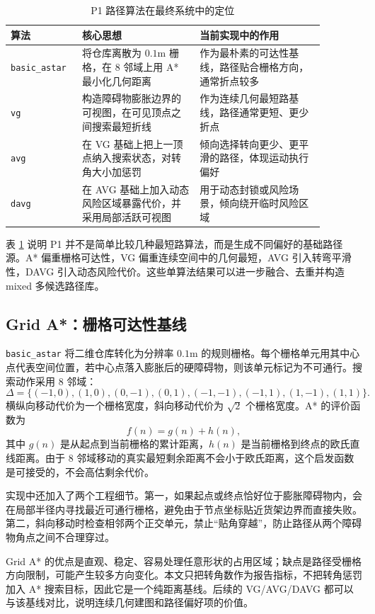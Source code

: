 \begin{table}[H]
\centering
\small
\begin{tabular}{p{0.18\linewidth}p{0.34\linewidth}p{0.36\linewidth}}
\toprule
算法 & 核心思想 & 当前实现中的作用 \\
\midrule
\verb|basic_astar| & 将仓库离散为 $0.1$m 栅格，在 8 邻域上用 A* 最小化几何距离 & 作为最朴素的可达性基线，路径贴合栅格方向，通常折点较多 \\
\verb|vg| & 构造障碍物膨胀边界的可视图，在可见顶点之间搜索最短折线 & 作为连续几何最短路基线，路径通常更短、更少折点 \\
\verb|avg| & 在 VG 基础上把上一顶点纳入搜索状态，对转角大小加惩罚 & 倾向选择转向更少、更平滑的路径，体现运动执行偏好 \\
\verb|davg| & 在 AVG 基础上加入动态风险区域暴露代价，并采用局部活跃可视图 & 用于动态封锁或风险场景，倾向绕开临时风险区域 \\

\bottomrule
\end{tabular}
\caption{P1 路径算法在最终系统中的定位}
\label{tab:p1-methods}
\end{table}

表 \ref{tab:p1-methods} 说明 P1 并不是简单比较几种最短路算法，而是生成不同偏好的基础路径源。A* 偏重栅格可达性，VG 偏重连续空间中的几何最短，AVG 引入转弯平滑性，DAVG 引入动态风险代价。这些单算法结果可以进一步融合、去重并构造 mixed 多候选路径库。

\subsection{Grid A*：栅格可达性基线}

\verb|basic_astar| 将二维仓库转化为分辨率 $0.1$m 的规则栅格。每个栅格单元用其中心点代表空间位置，若中心点落入膨胀后的硬障碍物，则该单元标记为不可通行。搜索动作采用 8 邻域：
\[
  \Delta=\{(-1,0),(1,0),(0,-1),(0,1),(-1,-1),(-1,1),(1,-1),(1,1)\}.
\]
横纵向移动代价为一个栅格宽度，斜向移动代价为 $\sqrt{2}$ 个栅格宽度。A* 的评价函数为
\[
  f(n)=g(n)+h(n),
\]
其中 $g(n)$ 是从起点到当前栅格的累计距离，$h(n)$ 是当前栅格到终点的欧氏直线距离。由于 8 邻域移动的真实最短剩余距离不会小于欧氏距离，这个启发函数是可接受的，不会高估剩余代价。

实现中还加入了两个工程细节。第一，如果起点或终点恰好位于膨胀障碍物内，会在局部半径内寻找最近可通行栅格，避免由于节点坐标贴近货架边界而直接失败。第二，斜向移动时检查相邻两个正交单元，禁止“贴角穿越”，防止路径从两个障碍物角点之间不合理穿过。

Grid A* 的优点是直观、稳定、容易处理任意形状的占用区域；缺点是路径受栅格方向限制，可能产生较多方向变化。本文只把转角数作为报告指标，不把转角惩罚加入 A* 搜索目标，因此它是一个纯距离基线。后续的 VG/AVG/DAVG 都可以与该基线对比，说明连续几何建图和路径偏好项的价值。

